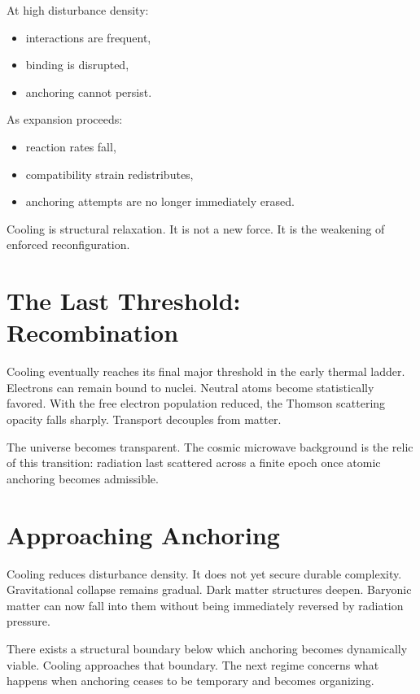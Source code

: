 \documentclass[11pt,twoside,openright]{book}
\begin{document}
At high disturbance density:

\begin{itemize}
\item interactions are frequent,
\item binding is disrupted,
\item anchoring cannot persist.
\end{itemize}

As expansion proceeds:

\begin{itemize}
\item reaction rates fall,
\item compatibility strain redistributes,
\item anchoring attempts are no longer immediately erased.
\end{itemize}

Cooling is structural relaxation. It is not a new force. It is the weakening of enforced reconfiguration.

\section*{The Last Threshold: Recombination}

Cooling eventually reaches its final major threshold in the early thermal ladder. Electrons can remain bound to nuclei. Neutral atoms become statistically favored. With the free electron population reduced, the Thomson scattering opacity falls sharply. Transport decouples from matter.

The universe becomes transparent. The cosmic microwave background is the relic of this transition: radiation last scattered across a finite epoch once atomic anchoring becomes admissible.

\section*{Approaching Anchoring}

Cooling reduces disturbance density. It does not yet secure durable complexity. Gravitational collapse remains gradual. Dark matter structures deepen. Baryonic matter can now fall into them without being immediately reversed by radiation pressure.

There exists a structural boundary below which anchoring becomes dynamically viable. Cooling approaches that boundary. The next regime concerns what happens when anchoring ceases to be temporary and becomes organizing.
\end{document}
